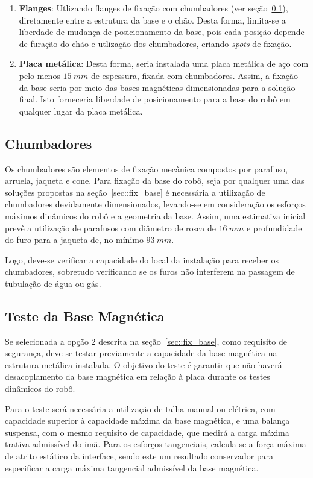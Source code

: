 \begin{enumerate}
  \item \textbf{Flanges}: Utlizando flanges de fixação com chumbadores (ver
  seção~\ref{sec::chumbadores}), diretamente entre a estrutura da base e o chão.
  Desta forma, limita-se a liberdade de mudança de posicionamento da base, pois 
  cada posição depende de furação do chão e utlização dos chumbadores, criando \textit{spots} de fixação.
  \item \textbf{Placa metálica}: Desta forma, seria instalada uma placa metálica
  de aço com pelo menos $15~mm$ de espessura, fixada com chumbadores. Assim, a
  fixação da base seria por meio das bases magnéticas dimensionadas para
  a solução final. Isto forneceria liberdade de posicionamento para a base do
  robô em qualquer lugar da placa metálica.
\end{enumerate}

 
 \subsection{Chumbadores}\label{sec::chumbadores}
 
 Os chumbadores são elementos de fixação mecânica compostos por parafuso,
 arruela, jaqueta e cone.
 Para fixação da base do robô, seja por qualquer uma
 das soluções propostas na seção~\ref{sec::fix_base} é necessária a utilização 
 de chumbadores devidamente dimensionados, levando-se em consideração os
 esforços  máximos dinâmicos do robô e a geometria da base.
 Assim, uma estimativa inicial prevê a utilização de parafusos com diâmetro de
 rosca de $16~mm$ e profundidade do furo para a jaqueta de, no mínimo $93~mm$.
 
 Logo, deve-se verificar a capacidade do local da instalação para receber os
 chumbadores, sobretudo verificando se os furos não interferem na passagem de
 tubulação de água ou gás.
 
 \subsection{Teste da Base Magnética}
 
 Se selecionada a opção $2$ descrita na seção~\ref{sec::fix_base}, como
 requisito de segurança, deve-se testar previamente a capacidade da base
 magnética na estrutura metálica instalada.
 O objetivo do teste é garantir que não haverá desacoplamento da base magnética
 em relação à placa durante os testes dinâmicos do robô.
 
 Para o teste será necessária a utilização de talha manual ou elétrica, com
 capacidade superior à capacidade máxima da base magnética, e uma balança
 suspensa, com o mesmo requisito de capacidade, que medirá a carga máxima
 trativa admissível do imã. 
 Para os esforços tangenciais, calcula-se a força máxima de atrito estático da
 interface, sendo este um resultado conservador para especificar a carga máxima
 tangencial admissível da base magnética.
